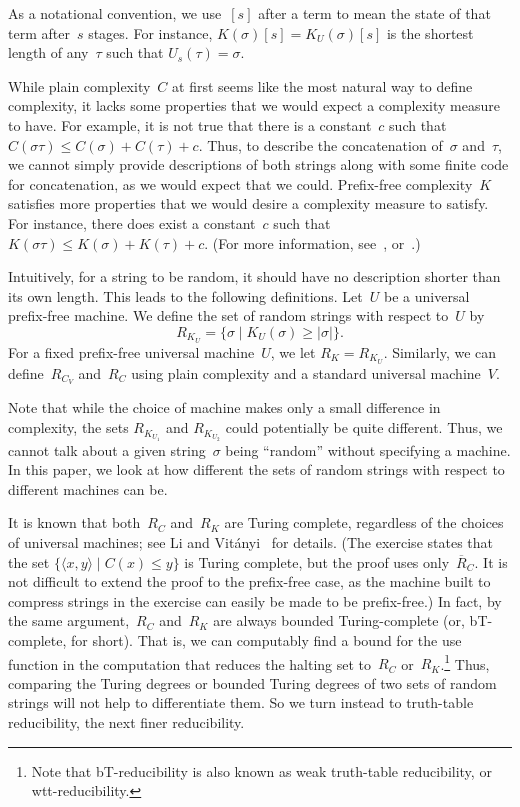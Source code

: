 \documentclass{LMCS}
\newcommand{\0}{\mathbf{0}}
\newcommand{\ov}{\overline}
\newcommand{\<}{\langle}
\renewcommand{\>}{\rangle}
\begin{document}
As a notational convention, we use~$[s]$ after a term to mean the state of
that term after~$s$ stages.  For instance, $K(\sigma)[s]=K_U(\sigma)[s]$ is
the shortest length of any~$\tau$ such that $U_s(\tau)=\sigma$.

While plain complexity~$C$ at first seems like the most natural way to define
complexity, it lacks some properties that we would expect a complexity
measure to have.  For example, it is not true that there is a constant~$c$
such that $C(\sigma\tau)\leq C(\sigma)+C(\tau)+c$.  Thus, to describe the
concatenation of~$\sigma$ and~$\tau$, we cannot simply provide descriptions
of both strings along with some finite code for concatenation, as we would
expect that we could.  Prefix-free complexity~$K$ satisfies more properties
that we would desire a complexity measure to satisfy.  For instance, there
does exist a constant~$c$ such that $K(\sigma\tau)\leq K(\sigma)+K(\tau)+c$.
(For more information, see~\cite[p.~83]{Nies},
or~\cite[p.~121]{Downey-Hirschfeldt}.)

Intuitively, for a string to be random, it should have no description shorter
than its own length.  This leads to the following definitions.  Let~$U$ be a
universal prefix-free machine.  We define the set of random strings with
respect to~$U$ by
$$
R_{K_U}=\{\sigma \mid K_U(\sigma)\geq |\sigma|\}.
$$
For a fixed prefix-free universal machine~$U$, we let $R_K=R_{K_U}$.
Similarly, we can define~$R_{C_V}$ and~$R_C$ using plain complexity and a
standard universal machine~$V$.

Note that while the choice of machine makes only a small difference in
complexity, the sets $R_{K_{U_1}}$ and $R_{K_{U_2}}$ could potentially be
quite different.  Thus, we cannot talk about a given string~$\sigma$ being
``random'' without specifying a machine.  In this paper, we look at how
different the sets of random strings with respect to different machines can
be.

It is known that both~$R_C$ and~$R_K$ are Turing complete, regardless of the
choices of universal machines; see Li and
Vit\'anyi~\cite[Exer\-cise~2.7.7]{LiVitanyi} for details.  (The exercise
states that the set $\{\langle x,y\rangle \mid C(x)\leq y\}$ is Turing
complete, but the proof uses only~$\ov R_C$.  It is not difficult to extend
the proof to the prefix-free case, as the machine built to compress strings
in the exercise can easily be made to be prefix-free.)  In fact, by the same
argument,~$R_C$ and~$R_K$ are always bounded Turing-complete (or,
bT-complete, for short). That is, we can computably find a bound for the use
function in the computation that reduces the halting set to~$R_C$
or~$R_K$.\footnote{Note that bT-reducibility is also known as weak
truth-table reducibility, or wtt-reducibility.} Thus, comparing the Turing
degrees or bounded Turing degrees of two sets of random strings will not help
to differentiate them. So we turn instead to truth-table reducibility, the
next finer reducibility.
\end{document}
